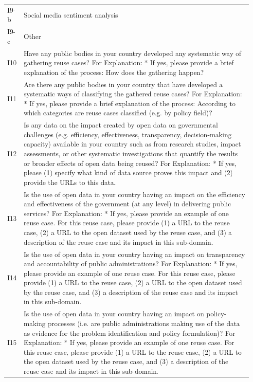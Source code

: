 {\begin{longtable}[]{@{}
  L{0.1386}
  L{0.8614}@{}}
I9-b & Social media sentiment analysis \\
I9-c & Other \\
I10 & Have any public bodies in your country developed any systematic way of gathering reuse cases? For Explanation: * If yes, please provide a brief explanation of the process: How does the gathering happen? \\
I11 & Are there any public bodies in your country that have developed a systematic ways of classifying the gathered reuse cases? For Explanation: * If yes, please provide a brief explanation of the process: According to which categories are reuse cases classified (e.g. by policy field)? \\
I12 & Is any data on the impact created by open data on governmental challenges (e.g. efficiency, effectiveness, transparency, decision-making capacity) available in your country such as from research studies, impact assessments, or other systematic investigations that quantify the results or broader effects of open data being reused? For Explanation: * If yes, please (1) specify what kind of data source proves this impact and (2) provide the URLs to this data. \\
I13 & Is the use of open data in your country having an impact on the efficiency and effectiveness of the government (at any level) in delivering public services? For Explanation: * If yes, please provide an example of one reuse case. For this reuse case, please provide (1) a URL to the reuse case, (2) a URL to the open dataset used by the reuse case, and (3) a description of the reuse case and its impact in this sub-domain. \\
I14 & Is the use of open data in your country having an impact on transparency and accountability of public administrations? For Explanation: * If yes, please provide an example of one reuse case. For this reuse case, please provide (1) a URL to the reuse case, (2) a URL to the open dataset used by the reuse case, and (3) a description of the reuse case and its impact in this sub-domain. \\
I15 & Is the use of open data in your country having an impact on policy-making processes (i.e. are public administrations making use of the data as evidence for the problem identification and policy formulation)? For Explanation: * If yes, please provide an example of one reuse case. For this reuse case, please provide (1) a URL to the reuse case, (2) a URL to the open dataset used by the reuse case, and (3) a description of the reuse case and its impact in this sub-domain. \\

\end{longtable}}
